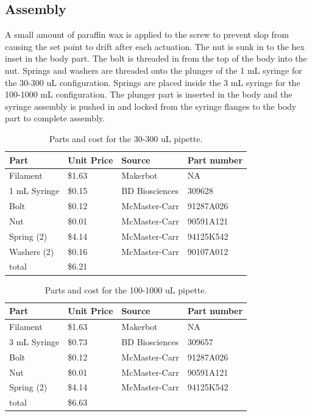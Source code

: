 \documentclass[10pt,letterpaper]{article}
\begin{document}
\subsection*{Assembly}

A small amount of paraffin wax is applied to the screw to prevent slop from causing the set point to drift after each actuation.
The nut is sunk in to the hex inset in the body part.
The bolt is threaded in from the top of the body into the nut.
Springs and washers are threaded onto the plunger of the 1 mL syringe for the 30-300 uL configuration.
Springs are placed inside the 3 mL syringe for the 100-1000 mL configuration.
The plunger part is inserted in the body and the syringe assembly is pushed in and locked from the syringe flanges to the body part to complete assembly.

\begin{table}[!ht]
\centering
\caption{Parts and cost for the 30-300 uL pipette.}
\label{table1}
\begin{tabular}{|l|l|l|l|}
	\hline
	Part         & Unit Price & Source         & Part number \\ \hline
	Filament     & \$1.63     & Makerbot       & NA          \\ \hline
	1 mL Syringe & \$0.15     & BD Biosciences & 309628      \\ \hline
	Bolt         & \$0.12     & McMaster-Carr  & 91287A026   \\ \hline
	Nut          & \$0.01     & McMaster-Carr  & 90591A121   \\ \hline
	Spring (2)   & \$4.14     & McMaster-Carr  & 94125K542   \\ \hline
	Washers (2)  & \$0.16     & McMaster-Carr  & 90107A012   \\ \hline
	total        & \$6.21     &                &             \\ \hline
\end{tabular}
\end{table}

\begin{table}[!ht]
\centering
\caption{Parts and cost for the 100-1000 uL pipette.}
\label{table2}
\begin{tabular}{|l|l|l|l|}
	\hline
	Part         & Unit Price & Source         & Part number \\ \hline
	Filament     & \$1.63     & Makerbot       & NA          \\ \hline
	3 mL Syringe & \$0.73     & BD Biosciences & 309657      \\ \hline
	Bolt         & \$0.12     & McMaster-Carr  & 91287A026   \\ \hline
	Nut          & \$0.01     & McMaster-Carr  & 90591A121   \\ \hline
	Spring (2)   & \$4.14     & McMaster-Carr  & 94125K542   \\ \hline
	total        & \$6.63     &                &             \\ \hline
\end{tabular}
\end{table}
\end{document}
